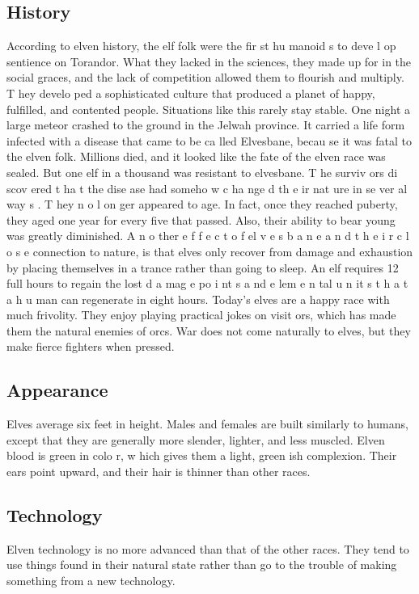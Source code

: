 \begin{multicols*}{2}
\subsection{History}
According to elven history, the elf folk were the
fir st hu manoid s to deve l op sentience on Torandor. What
they lacked in the sciences, they made up for in the social
graces, and the lack of competition allowed them to flourish
and multiply. T hey develo ped a sophisticated culture that
produced a planet of happy, fulfilled, and contented people.
Situations like this rarely stay stable. One night a
large meteor crashed to the ground in the Jelwah province. It
carried a life form infected with a disease that came to be
ca lled Elvesbane, becau se it was fatal to the elven folk.
Millions died, and it looked like the fate of the elven race was
sealed.
But one elf in a thousand was resistant to elvesbane.
T he surviv ors di scov ered t ha t the dise ase had someho w
c ha nge d th e ir nat ure in se ver al way s . T hey n o l on ger
appeared to age. In fact, once they reached puberty, they aged
one year for every five that passed. Also, their ability to bear
young was greatly diminished.
A n o ther e f f e c t o f el v e s b a n e a n d t h e i r c l o s e
connection to nature, is that elves only recover from damage
and exhaustion by placing themselves in a trance rather than
going to sleep. An elf requires 12 full hours to regain the lost
d a mag e po i nt s a nd e lem e n tal u n it s t h a t a h u man can
regenerate in eight hours.
Today’s elves are a happy race with much frivolity.
They enjoy playing practical jokes on visit ors, which has
made them the natural enemies of orcs. War does not come
naturally to elves, but they make fierce fighters when pressed.
\subsection{Appearance}
Elves average six feet in height. Males and females
are built similarly to humans, except that they are generally
more slender, lighter, and less muscled. Elven blood is green
in colo r, w hich gives them a light, green ish complexion.
Their ears point upward, and their hair is thinner than other
races.
\subsection{Technology}
Elven technology is no more advanced than that of
the other races. They tend to use things found in their natural
state rather than go to the trouble of making something from a
new technology.

\end{multicols*}
